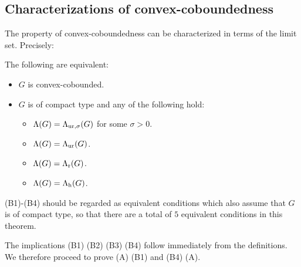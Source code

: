 \subsection{Characterizations of convex-coboundedness}
The property of convex-coboundedness can be characterized in terms of the limit set. Precisely:

\begin{theorem}\label{theoremCCBcompact}
The following are equivalent:
\begin{itemize}
\item[(A)] $G$ is convex-cobounded.
\item[(B)] $G$ is of compact type and any of the following hold:
\begin{itemize}
\item[(B1)] $\Lambda(G) = \Lambda_{\mathrm{ur},\sigma}(G)$ for some $\sigma > 0$.
\item[(B2)] $\Lambda(G) = \Lambda_{\mathrm{ur}}(G)$.
\item[(B3)] $\Lambda(G) = \Lambda_{\mathrm r}(G)$.
\item[(B4)] $\Lambda(G) = \Lambda_{\mathrm h}(G)$.
\end{itemize}
\end{itemize}
\end{theorem}
\begin{remark}
\label{remarkanyBn}
(B1)-(B4) should be regarded as equivalent conditions which also assume that $G$ is of compact type, so that there are a total of $5$ equivalent conditions in this theorem.
\end{remark}
The implications (B1) \implies (B2) \implies (B3) \implies (B4) follow immediately from the definitions. We therefore proceed to prove (A) \implies (B1) and (B4) \implies (A).

